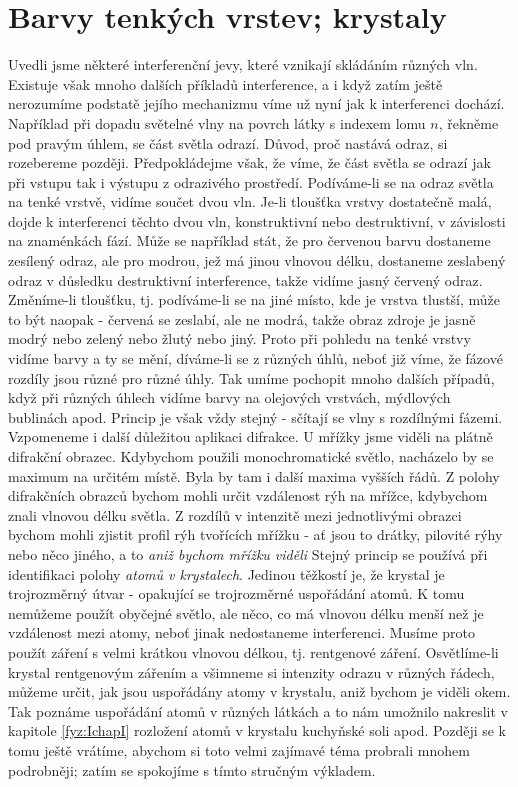 {  \section{Barvy tenkých vrstev; krystaly}\label{fyz:IchapXXXsecV}
    Uvedli jsme některé interferenční jevy, které vznikají skládáním různých vln. Existuje však 
    mnoho dalších příkladů interference, a i když zatím ještě nerozumíme podstatě jejího mechanizmu 
    víme už nyní jak k interferenci dochází. Například při dopadu světelné vlny na povrch látky s 
    indexem lomu \(n\), řekněme pod pravým úhlem, se část světla odrazí. Důvod, proč nastává odraz, 
    si rozebereme později. Předpokládejme však, že víme, že část světla se odrazí jak při vstupu 
    tak i výstupu z odrazivého prostředí. Podíváme-li se na odraz světla na tenké vrstvě, vidíme 
    součet dvou vln. Je-li tloušťka vrstvy dostatečně malá, dojde k interferenci těchto dvou vln, 
    konstruktivní nebo destruktivní, v závislosti na znaménkách fází. Může se například stát, že 
    pro červenou barvu dostaneme zesílený odraz, ale pro modrou, jež má jinou vlnovou délku, 
    dostaneme zeslabený odraz v důsledku destruktivní interference, takže vidíme jasný červený 
    odraz. Změníme-li tloušťku, tj. podíváme-li se na jiné místo, kde je vrstva tlustší, může to 
    být naopak - červená se zeslabí, ale ne modrá, takže obraz zdroje je jasně modrý nebo     
    zelený nebo žlutý nebo jiný. Proto při pohledu na tenké vrstvy vidíme barvy a ty se mění, 
    díváme-li se z různých úhlů, neboť již víme, že fázové rozdíly jsou různé pro různé úhly. Tak 
    umíme pochopit mnoho dalších případů, když při různých úhlech vidíme barvy na olejových 
    vrstvách, mýdlových bublinách apod. Princip je však vždy stejný - sčítají se vlny s rozdílnými 
    fázemi. Vzpomeneme i další důležitou aplikaci difrakce. U mřížky jsme viděli na plátně 
    difrakční obrazec. Kdybychom použili monochromatické světlo, nacházelo by se maximum na určitém 
    místě. Byla by tam i další maxima vyšších řádů. Z polohy difrakčních obrazců bychom mohli určit 
    vzdálenost rýh na mřížce, kdybychom znali vlnovou délku světla. Z rozdílů v intenzitě mezi 
    jednotlivými obrazci bychom mohli zjistit profil rýh tvořících mřížku - ať jsou to drátky, 
    pilovité rýhy nebo něco jiného, a to \emph{aniž bychom mřížku viděli} Stejný princip se používá 
    při identifikaci polohy \emph{atomů v krystalech}. Jedinou těžkostí je, že krystal je 
    trojrozměrný útvar - opakující se trojrozměrné uspořádání atomů. K tomu nemůžeme použít 
    obyčejné světlo, ale něco, co má vlnovou délku menší než je vzdálenost mezi atomy, neboť jinak 
    nedostaneme interferenci. Musíme proto použít záření s velmi krátkou vlnovou délkou, tj. 
    rentgenové záření. Osvětlíme-li krystal rentgenovým zářením a všimneme si intenzity odrazu v 
    různých řádech, můžeme určit, jak jsou uspořádány atomy v krystalu, aniž bychom je viděli okem. 
    Tak poznáme uspořádání atomů v různých látkách a to nám umožnilo nakreslit v kapitole 
    \ref{fyz:IchapI} rozložení atomů v krystalu kuchyňské soli apod. Později se k tomu ještě 
    vrátíme, abychom si toto velmi zajímavé téma probrali mnohem podrobněji; zatím se spokojíme s 
    tímto stručným výkladem.
  
}

